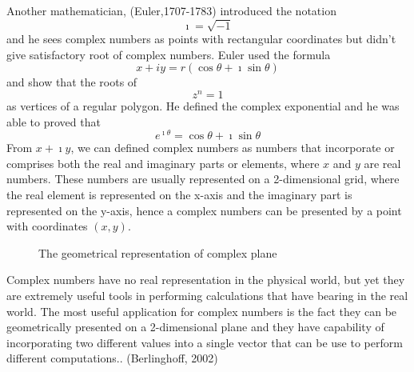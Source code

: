 \documentclass[11pt]{report}
\newcommand{\NI}{\noindent}
\newcommand{\real}{ \mathbb{R}}
\newcommand{\imaginary}{\imath}
\begin{document}
	\NI Another mathematician, (Euler,1707-1783) introduced the notation 
	\begin{equation}
		\imaginary = \sqrt{-1}\label{eq:1_7}
	\end{equation}
	 and he sees complex numbers as points with rectangular coordinates but didn't give satisfactory root of complex numbers. Euler used the formula
	\begin{equation}
		x+iy= r(\cos\theta + \imaginary\sin\theta)\label{eq:1_8}
	\end{equation}
	and show that the roots of 
	\begin{equation}
		z^n=1\label{eq:1_9}
	\end{equation}
	as vertices of a regular polygon. He defined the complex exponential and he was able to proved that 
	\begin{equation}
		e^{\imaginary\theta} = \cos\theta + \imaginary\sin\theta\label{eq:1_10}
	\end{equation}
	From $x+\imaginary y$, we can defined complex numbers as numbers that incorporate or comprises both the real and imaginary parts or elements, where $x$ and $y$ are real numbers. These numbers are usually represented on a 2-dimensional grid, where the real element is represented on the x-axis and the imaginary part is represented on the y-axis, hence a complex numbers can be presented by a point with coordinates $(x,y)$.
	
	\begin{figure}[!h]
		\centering
		\caption{The geometrical representation of complex plane}\label{fig:1_1}
	\end{figure}
	Complex numbers have no real representation in the physical world, but yet they are extremely useful tools in performing calculations that have bearing in the real world. The most useful application for complex numbers is the fact they can be geometrically presented on a 2-dimensional plane and they have capability of incorporating two different values into a single vector that can be use to perform different computations.. (Berlinghoff, 2002)\\
	
\end{document}
